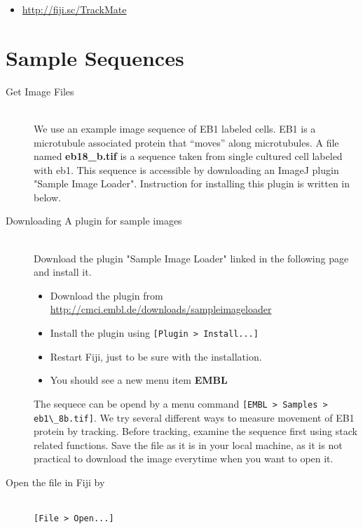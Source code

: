 \documentclass[11pnt]{article}
\begin{document}
\begin{itemize}
\item \url{http://fiji.sc/TrackMate}
\end{itemize}

\section{Sample Sequences}

\begin{description}

\item[Get Image Files]\hfill\\

We use an example image sequence of EB1 labeled cells. EB1 is a microtubule associated protein that ``moves'' along microtubules. A file named \textbf{eb18\_b.tif} is a sequence taken from single cultured cell labeled with eb1. This sequence is accessible by downloading an ImageJ plugin "Sample Image Loader". Instruction for installing this plugin is written in below.  

\item[Downloading A plugin for sample images]\hfill\\

Download the plugin "Sample Image Loader" linked in the following page and install it. 
\begin{itemize}
\item Download the plugin from \url{http://cmci.embl.de/downloads/sampleimageloader}
\item Install the plugin using \verb"[Plugin > Install...]"
\item Restart Fiji, just to be sure with the installation. 
\item You should see a new menu item \textbf{EMBL}
\end{itemize}


The sequece can be opend by a menu command \verb"[EMBL > Samples > eb1\_8b.tif]". We try several different ways to measure movement of EB1 protein by tracking. Before tracking, examine the sequence first using stack related functions. Save the file as it is in your local machine, as it is not practical to download the image everytime when you want to open it. 

\item[Open the file in Fiji by]\hfill\\

\verb"[File > Open...]"\\


\end{description}
\end{document}
